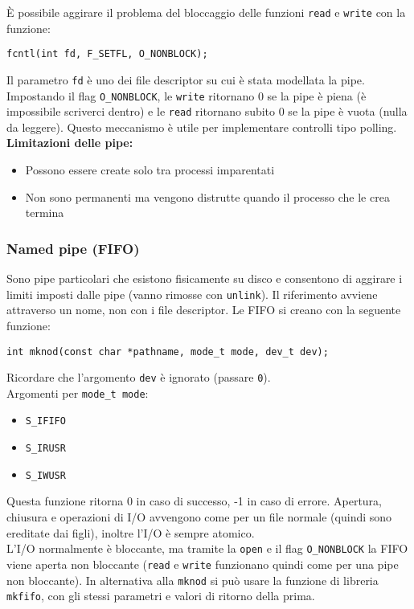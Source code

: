 \documentclass[a4paper, 10pt]{article}
\begin{document}
È possibile aggirare il problema del bloccaggio delle funzioni \verb|read| e \verb|write| con la funzione:
\begin{verbatim}
fcntl(int fd, F_SETFL, O_NONBLOCK);
\end{verbatim}
Il parametro \verb|fd| è uno dei file descriptor su cui è stata modellata la pipe.
Impostando il flag \verb|O_NONBLOCK|, le \verb|write| ritornano 0 se la pipe è piena (è impossibile scriverci dentro) e le \verb|read| ritornano subito 0 se la pipe è vuota (nulla da leggere).
Questo meccanismo è utile per implementare controlli tipo polling. \\

\textbf{Limitazioni delle pipe:} 
\begin{itemize}
\item Possono essere create solo tra processi imparentati
\item Non sono permanenti ma vengono distrutte quando il processo  che le crea termina
\end{itemize}

\subsubsection{Named pipe (FIFO)}
Sono pipe particolari che esistono fisicamente su disco e consentono di aggirare i limiti imposti dalle pipe (vanno rimosse con \verb|unlink|). Il riferimento avviene attraverso un nome, non con i file descriptor.
Le FIFO si creano con la seguente funzione:
\begin{verbatim}
int mknod(const char *pathname, mode_t mode, dev_t dev); 
\end{verbatim}
Ricordare che l'argomento \verb|dev| è ignorato (passare \verb|0|). \\
Argomenti per \verb|mode_t mode|:
\begin{itemize}
\item \verb|S_IFIFO|
\item \verb|S_IRUSR| 
\item \verb|S_IWUSR|
\end{itemize}
Questa funzione ritorna 0 in caso di successo, -1 in caso di errore.
Apertura, chiusura e operazioni di I/O avvengono come per un file normale (quindi sono ereditate dai figli), inoltre l'I/O è sempre atomico. \\
L'I/O normalmente è bloccante, ma tramite la \verb|open| e il flag \verb|O_NONBLOCK| la FIFO viene aperta non bloccante (\verb|read| e \verb|write| funzionano quindi come per una pipe non bloccante).
In alternativa alla \verb|mknod| si può usare la funzione di libreria \verb|mkfifo|, con gli stessi parametri e valori di ritorno della prima.
\end{document}
